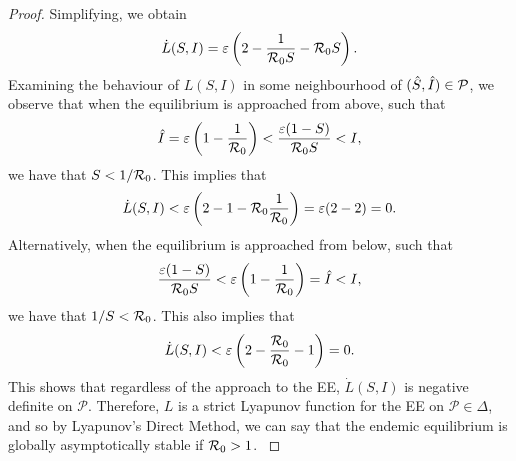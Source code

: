 \documentclass[12pt]{article}\usepackage[]{graphicx}\usepackage[]{color}
\begin{document}
\begin{enumerate}[(a)]
{\begin{proof}
{Simplifying, we obtain
$$\dot{L} (S, I) = \varepsilon \left(2 - \frac{1}{{\cal R}_0 S} - {\cal R}_0 S\right).$$
Examining the behaviour of $L(S, I)$ in some neighbourhood of $(\Hat{S}, \Hat{I}) \in \mathcal{P}$, we observe that when the equilibrium is approached from above, such that
$$\Hat{I} = \varepsilon\left(1 - \frac{1}{{\cal R}_0}\right) < \frac{\varepsilon(1 - S)}{{\cal R}_0 S} < I,$$
we have that $S < 1/{\cal R}_0$. This implies that
$$\dot{L} (S, I) < \varepsilon \left(2 - 1 - {\cal R}_0 \frac{1}{{\cal R}_0}\right) = \varepsilon(2 - 2) = 0.$$ 
Alternatively, when the equilibrium is approached from below, such that
$$\frac{\varepsilon(1 - S)}{{\cal R}_0 S} < \varepsilon \left(1 - \frac{1}{{\cal R}_0}\right) = \Hat{I} < I,$$
we have that $1/S < {\cal R}_0$. This also implies that
$$\dot{L} (S, I) < \varepsilon \left(2 - \frac{{\cal R}_0}{{\cal R}_0} - 1\right) = 0.$$
This shows that regardless of the approach to the EE, $\dot{L}(S, I)$ is negative definite on $\mathcal{P}$. Therefore, $L$ is a strict Lyapunov function for the EE on $\mathcal{P} \in \Delta$, and so by Lyapunov's Direct Method, we can say that the endemic equilibrium is globally asymptotically stable if ${\cal R}_0 > 1$.
}\end{proof}}


\end{enumerate}
\end{document}
